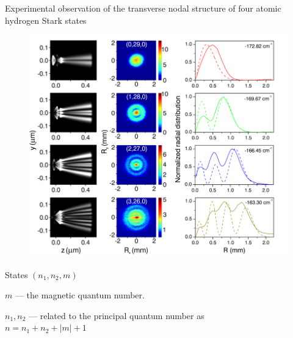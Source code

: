 Experimental observation of the transverse nodal structure of four atomic hydrogen Stark states
\begin{minipage}{0.55\textwidth}
    \begin{figure}[h]
        \centering
        \includegraphics[height=0.95\textwidth]{figures/3.png}
    \end{figure}
\end{minipage}
\hfill
\begin{minipage}{0.35\textwidth}
        States $(n_1,n_2,m)$ 

        \cmark $m$ --- the magnetic quantum number. 

        \cmark $n_1, n_2$ --- related to the principal quantum number as\\
        $
            n = n_1 + n_2 + |m| + 1
        $
\end{minipage}


